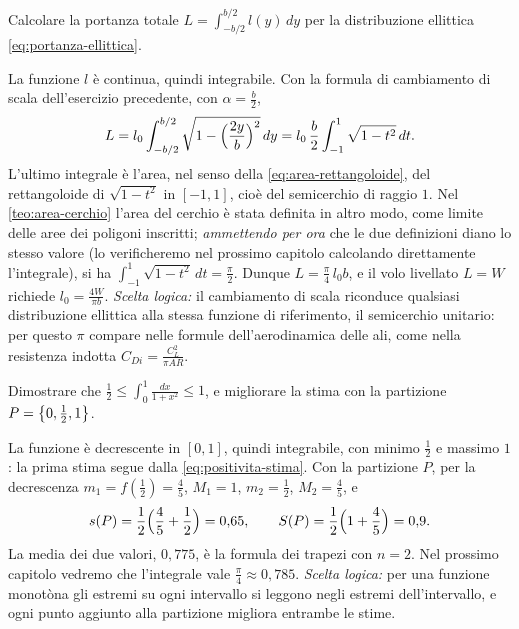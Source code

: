 \begin{esercizio}\label{es:portanza-ellittica-esatta}
Calcolare la portanza totale $L=\int_{-b/2}^{b/2}l(y)\,dy$ per la distribuzione
ellittica \eqref{eq:portanza-ellittica}.
\begin{soluzione}
La funzione $l$ è continua, quindi integrabile. Con la formula di cambiamento di scala
dell'esercizio precedente, con $\alpha=\frac b2$,
\[
  L=l_{0}\int_{-b/2}^{b/2}\sqrt{1-\Bigl(\frac{2y}b\Bigr)^{2}}\,dy
  =l_{0}\,\frac b2\int_{-1}^{1}\sqrt{1-t^{2}}\,dt .
\]
L'ultimo integrale è l'area, nel senso della \eqref{eq:area-rettangoloide}, del
rettangoloide di $\sqrt{1-t^{2}}$ in $[-1,1]$, cioè del semicerchio di raggio $1$. Nel
\cref{teo:area-cerchio} l'area del cerchio è stata definita in altro modo, come limite
delle aree dei poligoni inscritti; \emph{ammettendo per ora} che le due definizioni diano
lo stesso valore (lo verificheremo nel prossimo capitolo calcolando direttamente
l'integrale), si ha $\int_{-1}^{1}\sqrt{1-t^{2}}\,dt=\frac\pi2$. Dunque $L=\frac\pi4\,l_{0}b$, e il volo livellato $L=W$ richiede
$l_{0}=\frac{4W}{\pi b}$. \emph{Scelta logica:} il cambiamento di scala riconduce
qualsiasi distribuzione ellittica alla stessa funzione di riferimento, il semicerchio
unitario: per questo $\pi$ compare nelle formule dell'aerodinamica delle ali, come nella
resistenza indotta $C_{Di}=\frac{C_{L}^{2}}{\pi AR}$.
\end{soluzione}
\end{esercizio}

\begin{esercizio}
Dimostrare che $\frac12\le\int_{0}^{1}\frac{dx}{1+x^{2}}\le1$, e migliorare la stima con la
partizione $P=\left\{ 0,\frac12,1 \right\}$.
\begin{soluzione}
La funzione è decrescente in $[0,1]$, quindi integrabile, con minimo $\frac12$ e massimo
$1$: la prima stima segue dalla \eqref{eq:positivita-stima}. Con la partizione $P$, per
la decrescenza $m_{1}=f(\frac12)=\frac45$, $M_{1}=1$, $m_{2}=\frac12$, $M_{2}=\frac45$, e
\[
  s(P)=\frac12\Bigl(\frac45+\frac12\Bigr)=0{,}65, \qquad
  S(P)=\frac12\Bigl(1+\frac45\Bigr)=0{,}9 .
\]
La media dei due valori, $0{,}775$, è la formula dei trapezi con $n=2$. Nel prossimo
capitolo vedremo che l'integrale vale $\frac\pi4\approx0{,}785$. \emph{Scelta logica:} per
una funzione monotòna gli estremi su ogni intervallo si leggono negli estremi
dell'intervallo, e ogni punto aggiunto alla partizione migliora entrambe le stime.
\end{soluzione}
\end{esercizio}

